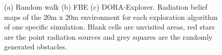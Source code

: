 \begin{figure}[h]
    \centering
    \caption{(a) Random walk (b) FBE (c) DORA-Explorer. Radiation belief maps of the 20m x 20m environment for each exploration algorithm of one specific simulation. Blank cells are unvisited areas, red stars are the point radiation sources and grey squares are the randomly generated obstacles.}
    \label{results:belief}
\end{figure}

